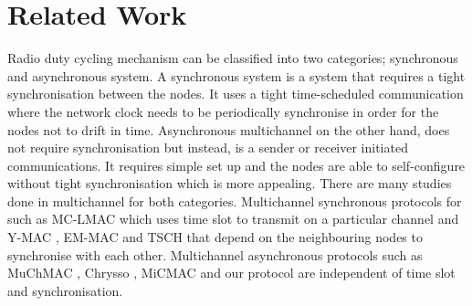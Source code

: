 \section{Related Work}

Radio duty cycling mechanism can be classified into two categories; synchronous and asynchronous system. A synchronous system is a system that requires a tight synchronisation between the nodes. It uses a tight time-scheduled communication where the network clock needs to be periodically synchronise in order for the nodes not to drift in time. Asynchronous multichannel on the other hand, does not require synchronisation but instead, is a sender or receiver initiated communications. It requires simple set up and the nodes are able to self-configure without tight synchronisation which is more appealing. There are many studies done in multichannel for both categories. Multichannel synchronous protocols for such as MC-LMAC \cite{mc-lmac} which uses time slot to transmit on a particular channel and Y-MAC \cite{y-mac}, EM-MAC \cite{emmac} and TSCH that depend on the neighbouring nodes to synchronise with each other. Multichannel asynchronous protocols such as MuChMAC \cite{muchmac}, Chrysso \cite{chrysso}, MiCMAC \cite{micmac} and our protocol are independent of time slot and synchronisation. 


